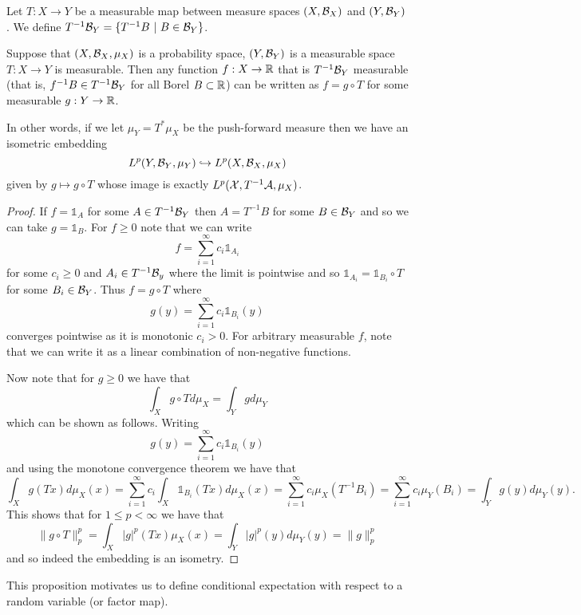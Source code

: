 \documentclass[twoside, a4paper, 10pt]{amsart}
\begin{document}
\begin{mydef} Let $T:X \to Y$ be a measurable map between measure spaces $(X,\mathcal{B}_X)$ and $(Y,\mathcal{B}_Y)$. We define $T^{-1}\mathcal{B}_Y = \{ T^{-1}B ~|~ B \in \mathcal{B}_Y\}$.

\end{mydef}

\begin{prop} Suppose that $(X,\mathcal{B}_X, \mu_X)$ is a probability space, $(Y,\mathcal{B}_Y)$ is a measurable space $T:X \to Y$ is measurable. Then any function $f:X \to \mathbb{R}$ that is $T^{-1}\mathcal{B}_Y$ measurable (that is, $f^{-1}B \in T^{-1}\mathcal{B}_Y$ for all Borel $B \subset \mathbb{R}$) can be written as $f = g \circ T$ for some measurable $g:Y \to \mathbb{R}$. 

In other words, if we let $\mu_Y = T^* \mu_X$ be the push-forward measure then we have an isometric embedding $$L^p(Y, \mathcal{B}_Y, \mu_Y) \hookrightarrow L^p(X,\mathcal{B}_X, \mu_X)$$ given by $g \mapsto g \circ T$ whose image is exactly $L^p(\mathcal{X}, T^{-1}\mathcal{A}, \mu_X)$.
\end{prop}

\begin{proof} If $f = \mathds{1}_A$ for some $A \in T^{-1}\mathcal{B}_Y$ then $A = T^{-1}B$ for some $B \in \mathcal{B}_Y$ and so we can take $g = \mathds{1}_B$. For $f \geq 0$ note that we can write $$f = \sum_{i=1}^{\infty} c_i \mathds{1}_{A_i}$$ for some $c_i \geq 0$ and $A_i \in T^{-1}\mathcal{B}_y$ where the limit is pointwise and so $\mathds{1}_{A_i} = \mathds{1}_{B_i} \circ T$ for some $B_i \in \mathcal{B}_Y$. Thus $f = g \circ T$ where $$g(y) = \sum_{i=1}^{\infty} c_i \mathds{1}_{B_i}(y)$$ converges pointwise as it is monotonic $c_i >0 $. For arbitrary measurable $f$, note that we can write it as a linear combination of non-negative functions. 

Now note that for $g \geq 0$ we have that $$\int_X g \circ T d\mu_X = \int_Y g d \mu_Y$$ which can be shown as follows. Writing $$g(y) = \sum_{i=1}^{\infty} c_i \mathds{1}_{B_i}(y)$$ and using the monotone convergence theorem we have that $$\int_X g(Tx) d\mu_X (x) = \sum_{i=1}^{\infty} c_i \int_X \mathds{1}_{B_i}(Tx) d\mu_X(x) = \sum_{i=1}^{\infty}c_i \mu_X(T^{-1}B_i) = \sum_{i=1}^{\infty}c_i \mu_Y(B_i) = \int_{Y} g(y) d\mu_Y(y) .$$ This shows that for $1 \leq p < \infty$ we have that $$\|g \circ T\|_p^p = \int_X |g|^p(Tx) \mu_X(x) = \int_Y |g|^p(y) d\mu_Y(y) = \|g\|_p^p$$ and so indeed the embedding is an isometry. \end{proof}

This proposition motivates us to define conditional expectation with respect to a random variable (or factor map). 
\end{document}
